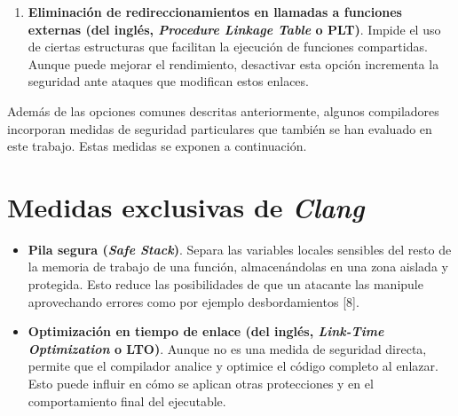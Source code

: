 \begin{enumerate}
  \begin{itemize}
  \item
    \textbf{AddressSanitizer}: identifica accesos incorrectos a memoria [4].
  \item
    \textbf{UndefinedBehaviorSanitizer}: detecta usos incorrectos del
    lenguaje que pueden provocar fallos difíciles de localizar [5].
  \item
    \textbf{MemorySanitizer}: avisa cuando se usa memoria sin haberla
    inicializado [6].
  \item
    \textbf{LeakSanitizer}: detecta si el programa pierde memoria sin
    liberarla (utilizado solo en Rust) [7].
  \end{itemize}
\item
  \textbf{Eliminación de redireccionamientos en llamadas a funciones externas (del inglés, \emph{Procedure Linkage Table} o PLT)}.
  Impide el uso de ciertas estructuras que facilitan la ejecución de
  funciones compartidas. Aunque puede mejorar el rendimiento,
  desactivar esta opción incrementa la seguridad ante ataques que modifican estos
  enlaces.
\end{enumerate}

Además de las opciones comunes descritas anteriormente, algunos
compiladores incorporan medidas de seguridad particulares que también se
han evaluado en este trabajo. Estas medidas se exponen a continuación.

\section{Medidas exclusivas de \emph{Clang}}

\begin{itemize}
\item
  \textbf{Pila segura (\emph{Safe Stack})}.
  Separa las variables locales sensibles del resto de la memoria de
  trabajo de una función, almacenándolas en una zona aislada y
  protegida. Esto reduce las posibilidades de que un atacante las
  manipule aprovechando errores como por ejemplo desbordamientos [8].
\item
  \textbf{Optimización en tiempo de enlace (del inglés, \emph{Link-Time Optimization} o
  LTO)}.
  Aunque no es una medida de seguridad directa, permite que el
  compilador analice y optimice el código completo al enlazar. Esto
  puede influir en cómo se aplican otras protecciones y en el
  comportamiento final del ejecutable.
\end{itemize}

